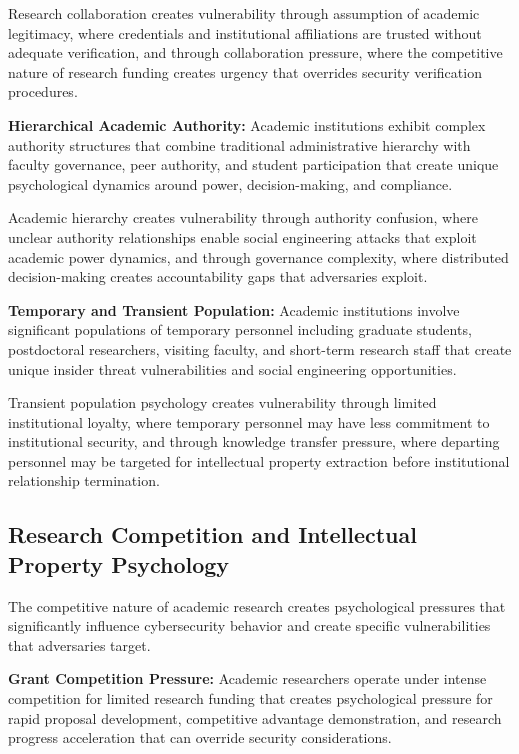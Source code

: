 \documentclass[10pt, twocolumn]{article}
\begin{document}
Research collaboration creates vulnerability through assumption of academic legitimacy, where credentials and institutional affiliations are trusted without adequate verification, and through collaboration pressure, where the competitive nature of research funding creates urgency that overrides security verification procedures.

\textbf{Hierarchical Academic Authority:} Academic institutions exhibit complex authority structures that combine traditional administrative hierarchy with faculty governance, peer authority, and student participation that create unique psychological dynamics around power, decision-making, and compliance.

Academic hierarchy creates vulnerability through authority confusion, where unclear authority relationships enable social engineering attacks that exploit academic power dynamics, and through governance complexity, where distributed decision-making creates accountability gaps that adversaries exploit.

\textbf{Temporary and Transient Population:} Academic institutions involve significant populations of temporary personnel including graduate students, postdoctoral researchers, visiting faculty, and short-term research staff that create unique insider threat vulnerabilities and social engineering opportunities.

Transient population psychology creates vulnerability through limited institutional loyalty, where temporary personnel may have less commitment to institutional security, and through knowledge transfer pressure, where departing personnel may be targeted for intellectual property extraction before institutional relationship termination.

\subsection{Research Competition and Intellectual Property Psychology}

The competitive nature of academic research creates psychological pressures that significantly influence cybersecurity behavior and create specific vulnerabilities that adversaries target.

\textbf{Grant Competition Pressure:} Academic researchers operate under intense competition for limited research funding that creates psychological pressure for rapid proposal development, competitive advantage demonstration, and research progress acceleration that can override security considerations.
\end{document}
